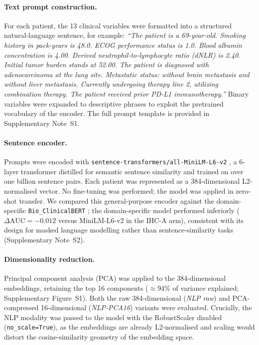 \paragraph{Text prompt construction.}
For each patient, the 13 clinical variables were formatted into a structured
natural-language sentence, for example:
\textit{``The patient is a 69-year-old. Smoking history in pack-years is 48.0.
ECOG performance status is 1.0. Blood albumin concentration is 4.00.
Derived neutrophil-to-lymphocyte ratio (dNLR) is 2.40.
Initial tumor burden stands at 52.00.
The patient is diagnosed with adenocarcinoma at the lung site.
Metastatic status: without brain metastasis and without liver metastasis.
Currently undergoing therapy line 2, utilizing combination therapy.
The patient received prior PD-L1 immunotherapy.''}
Binary variables were expanded to descriptive phrases to exploit the
pretrained vocabulary of the encoder.
The full prompt template is provided in Supplementary Note~S1.

\paragraph{Sentence encoder.}
Prompts were encoded with
\texttt{sentence-transformers/all-MiniLM-L6-v2} \cite{Reimers2019,Wang2020MiniLM},
a 6-layer transformer distilled for semantic sentence similarity and
trained on over one billion sentence pairs.
Each patient was represented as a 384-dimensional L2-normalised vector.
No fine-tuning was performed; the model was applied in zero-shot transfer.
We compared this general-purpose encoder against the domain-specific
\texttt{Bio\_ClinicalBERT} \cite{Alsentzer2019};
the domain-specific model performed inferiorly
($\Delta\text{AUC} = -0.012$ versus MiniLM-L6-v2 in the IHC-A arm),
consistent with its design for masked language modelling
rather than sentence-similarity tasks (Supplementary Note~S2).

\paragraph{Dimensionality reduction.}
Principal component analysis (PCA) was applied to the 384-dimensional embeddings,
retaining the top 16 components ($\approx$94\% of variance explained;
Supplementary Figure~S1).
Both the raw 384-dimensional (\emph{NLP raw}) and PCA-compressed
16-dimensional (\emph{NLP-PCA16}) variants were evaluated.
Crucially, the NLP modality was passed to the model with the RobustScaler
disabled (\texttt{no\_scale=True}), as the embeddings are already L2-normalised
and scaling would distort the cosine-similarity geometry of the embedding space.


